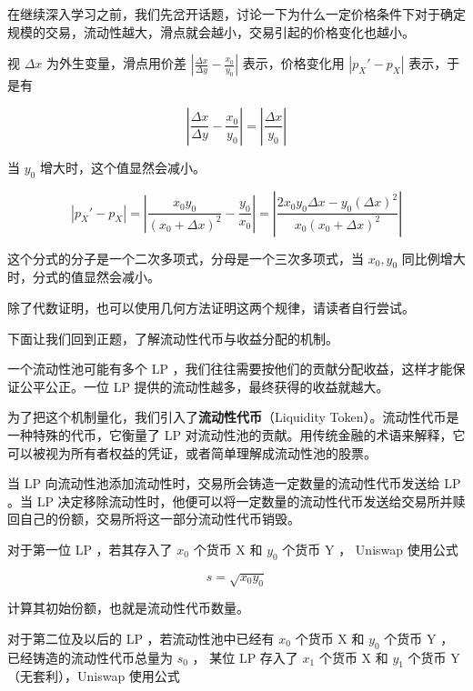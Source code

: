 \documentclass[12pt, a4paper, oneside]{ctexart}
\begin{document}
在继续深入学习之前，我们先岔开话题，讨论一下为什么一定价格条件下对于确定规模的交易，流动性越大，滑点就会越小，交易引起的价格变化也越小。

视 $\Delta x$ 为外生变量，滑点用价差 $\displaystyle \left| \frac{\Delta x}{\Delta y} - \frac{x_0}{y_0} \right|$ 表示，价格变化用 $|p_X'-p_X|$ 表示，于是有

\begin{equation}
    \left| \frac{\Delta x}{\Delta y} - \frac{x_0}{y_0} \right|
     = \left| \frac{\Delta x}{y_0} \right|
\end{equation}
    
\noindent 当 $y_0$ 增大时，这个值显然会减小。

\begin{equation}
    |p_X'-p_X| = \left| \frac{x_0y_0}{(x_0+\Delta x)^2} - \frac{y_0}{x_0} \right| = \left| \frac{2x_0y_0\Delta x - y_0(\Delta x)^2}{x_0(x_0+\Delta x)^2} \right|
\end{equation}

\noindent 这个分式的分子是一个二次多项式，分母是一个三次多项式，当 $x_0,y_0$ 同比例增大时，分式的值显然会减小。

除了代数证明，也可以使用几何方法证明这两个规律，请读者自行尝试。

下面让我们回到正题，了解流动性代币与收益分配的机制。

一个流动性池可能有多个 LP ，我们往往需要按他们的贡献分配收益，这样才能保证公平公正。一位 LP 提供的流动性越多，最终获得的收益就越大。

为了把这个机制量化，我们引入了\textbf{流动性代币}（Liquidity Token）。流动性代币是一种特殊的代币，它衡量了 LP 对流动性池的贡献。用传统金融的术语来解释，它可以被视为所有者权益的凭证，或者简单理解成流动性池的股票。

当 LP 向流动性池添加流动性时，交易所会铸造一定数量的流动性代币发送给 LP 。当 LP 决定移除流动性时，他便可以将一定数量的流动性代币发送给交易所并赎回自己的份额，交易所将这一部分流动性代币销毁。

对于第一位 LP ，若其存入了 $x_0$ 个货币 X 和 $y_0$ 个货币 Y ， Uniswap 使用公式

\begin{equation}
    s = \sqrt{x_0y_0}
\end{equation}

\noindent 计算其初始份额，也就是流动性代币数量。

对于第二位及以后的 LP ，若流动性池中已经有 $x_0$ 个货币 X 和 $y_0$ 个货币 Y ，已经铸造的流动性代币总量为 $s_0$ ， 某位 LP 存入了 $x_1$ 个货币 X 和 $y_1$ 个货币 Y （无套利），Uniswap 使用公式
\end{document}
